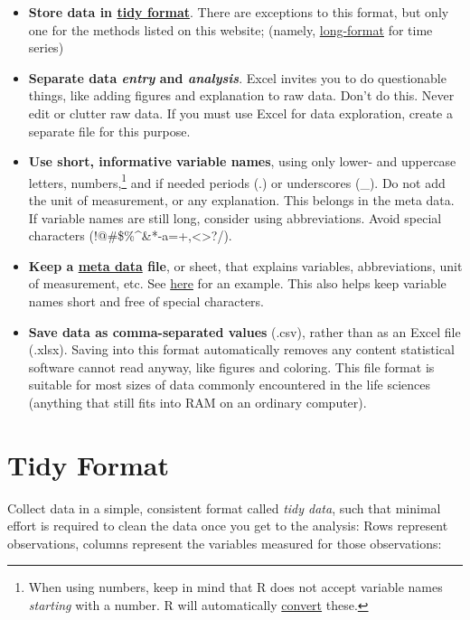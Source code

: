 \documentclass[
]{book}
\providecommand{\tightlist}{%
  \setlength{\itemsep}{0pt}\setlength{\parskip}{0pt}}
\begin{document}
\begin{itemize}
\tightlist
\item
  \textbf{Store data in \href{https://r4ds.had.co.nz/tidy-data.html\#fig:tidy-structure}{tidy format}}. There are exceptions to this format, but only one for the methods listed on this website; (namely, \href{https://stefvanbuuren.name/fimd/sec-longandwide.html}{long-format} for time series)
\item
  \textbf{Separate data \emph{entry} and \emph{analysis}}. Excel invites you to do questionable things, like adding figures and explanation to raw data. Don't do this. Never edit or clutter raw data. If you must use Excel for data exploration, create a separate file for this purpose.
\item
  \textbf{Use short, informative variable names}, using only lower- and uppercase letters, numbers,\footnote{When using numbers, keep in mind that R does not accept variable names \emph{starting} with a number. R will automatically \href{https://www.rdocumentation.org/packages/base/versions/3.6.2/topics/make.names}{convert} these.} and if needed periods (.) or underscores (\_). Do not add the unit of measurement, or any explanation. This belongs in the meta data. If variable names are still long, consider using abbreviations. Avoid special characters (!@\#\$\%\^{}\&*-a=+,\textless\textgreater?/).
\item
  \textbf{Keep a \protect\hyperlink{metadata}{meta data} file}, or sheet, that explains variables, abbreviations, unit of measurement, etc. See \href{https://docs.google.com/spreadsheets/d/1dcblrkYrCO5lz7akSCkguYSWHfGxfJh2f6Pg2B8Q9ck/edit\#gid=322816193}{here} for an example. This also helps keep variable names short and free of special characters.
\item
  \textbf{Save data as comma-separated values} (.csv), rather than as an Excel file (.xlsx). Saving into this format automatically removes any content statistical software cannot read anyway, like figures and coloring. This file format is suitable for most sizes of data commonly encountered in the life sciences (anything that still fits into RAM on an ordinary computer).
\end{itemize}

\hypertarget{tidy}{%
\section{Tidy Format}\label{tidy}}

Collect data in a simple, consistent format called \emph{tidy data},\citep{tidy} such that minimal effort is required to clean the data once you get to the analysis: Rows represent observations, columns represent the variables measured for those observations:
\end{document}
